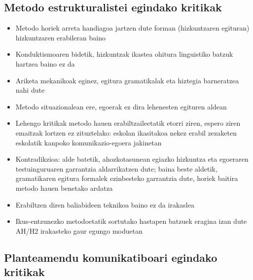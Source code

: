 \documentclass[
]{book}
\providecommand{\tightlist}{%
  \setlength{\itemsep}{0pt}\setlength{\parskip}{0pt}}
\begin{document}
\hypertarget{metodo-estrukturalistei-egindako-kritikak}{%
\subsection{Metodo estrukturalistei egindako kritikak}\label{metodo-estrukturalistei-egindako-kritikak}}

\begin{itemize}
\tightlist
\item
  Metodo horiek arreta handiagoa jartzen dute forman (hizkuntzaren egituran) hizkuntzaren erabileran baino
\item
  Konduktismoaren bidetik, hizkuntzak ikastea ohitura linguistiko batzuk hartzea baino ez da
\item
  Ariketa mekanikoak eginez, egitura gramatikalak eta hiztegia barneratzea nahi dute
\item
  Metodo situazionalean ere, egoerak ez dira lehenesten egituren aldean
\item
  Lehengo kritikak metodo hauen erabiltzaileetatik etorri ziren, espero ziren emaitzak lortzen ez zituztelako: eskolan ikasitakoa nekez erabil zezaketen eskolatik kanpoko komunikazio-egoera jakinetan
\item
  Kontradikzioa: alde batetik, ahozkotasunean egiazko hizkuntza eta egoeraren testuinguruaren garrantzia aldarrikatzen dute; baina beste aldetik, gramatikaren egitura formalek ezinbesteko garrantzia dute, horiek baitira metodo hauen benetako ardatza
\item
  Erabiltzen diren baliabideen teknikoa baino ez da irakaslea
\item
  Ikus-entzunezko metodoetatik sortutako hastapen batzuek eragina izan dute AH/H2 irakasteko gaur egungo moduetan
\end{itemize}

\hypertarget{planteamendu-komunikatiboari-egindako-kritikak}{%
\subsection{Planteamendu komunikatiboari egindako kritikak}\label{planteamendu-komunikatiboari-egindako-kritikak}}
\end{document}
